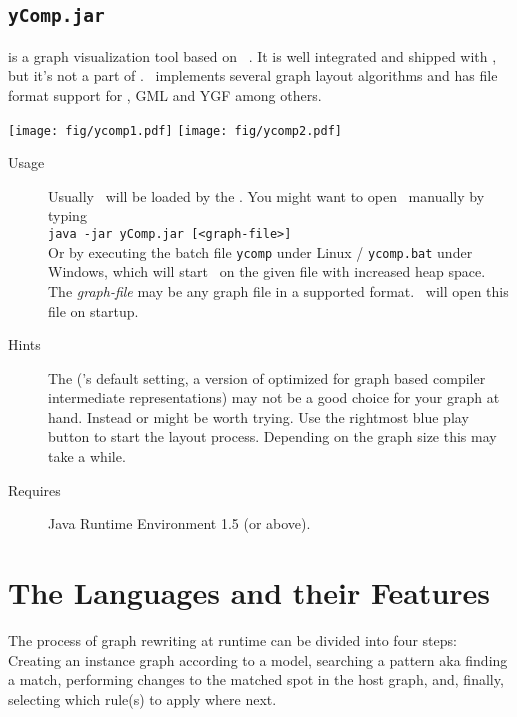 \subsection{\texttt{yComp.jar}}
\label{tools:ycomp}
\yComp{} \cite{ycomp} is a graph visualization tool based on \yFiles\ \cite{yfiles}.
It is well integrated and shipped with \GrG, but it's not a part of \GrG.
\yComp\ implements several graph layout algorithms and has file format support for , GML and YGF among others.
\begin{center}
\texttt{[image: fig/ycomp1.pdf]} \texttt{[image: fig/ycomp2.pdf]}
\end{center}
\begin{description}
  \item[Usage] Usually \yComp\ will be loaded by the \GrShell. You might want to open \yComp\ manually by typing\\
   \texttt{java -jar yComp.jar [<graph-file>]}\\
  Or by executing the batch file \texttt{ycomp} under Linux / \texttt{ycomp.bat} under Windows,
  which will start \yComp\ on the given file with increased heap space.
  The \emph{graph-file} may be any graph file in a supported format. \yComp\ will open this file on startup.
  \item[Hints] The   (\yComp's default setting, a version of \texttt{} optimized for graph based compiler intermediate representations) may not be a good choice for your graph at hand.
  Instead \texttt{} or \texttt{} might be worth trying.
  Use the rightmost blue play button to start the layout process. Depending on the graph size this may take a while.
  \item[Requires] Java Runtime Environment 1.5 (or above).
\end{description}


\section{The Languages and their Features}

The process of graph rewriting at runtime can be divided into four steps:
Creating an instance graph according to a model,
searching a pattern aka finding a match,
performing changes to the matched spot in the host graph,
and, finally, selecting which rule(s) to apply where next.

